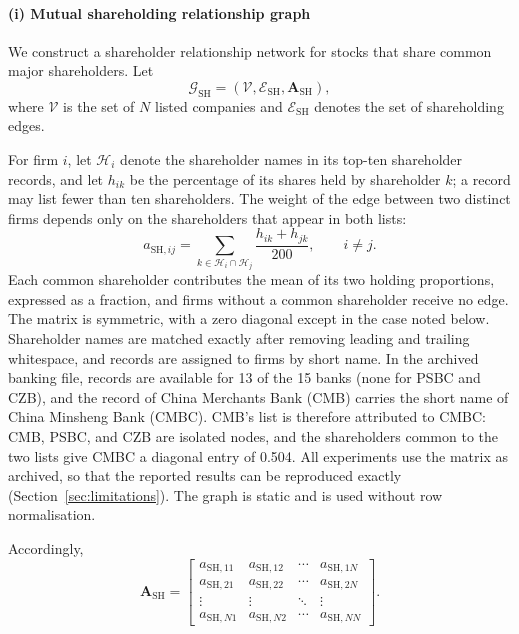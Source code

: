 \documentclass[pdflatex,sn-mathphys-num]{sn-jnl}%
\theoremstyle{thmstyleone}%
\theoremstyle{thmstyletwo}%
\theoremstyle{thmstylethree}%
\begin{document}
\paragraph{(i) Mutual shareholding relationship graph}
We construct a shareholder relationship network for stocks that share common major shareholders.
Let
\begin{equation}
\mathcal{G}_{\mathrm{SH}}=(\mathcal{V},\mathcal{E}_{\mathrm{SH}},\mathbf{A}_{\mathrm{SH}}),
\end{equation}
where $\mathcal{V}$ is the set of $N$ listed companies and $\mathcal{E}_{\mathrm{SH}}$ denotes the set of shareholding edges.
{\color{blue}
For firm $i$, let $\mathcal{H}_i$ denote the shareholder names in its top-ten shareholder records, and let $h_{ik}$ be the percentage of its shares held by shareholder $k$; a record may list fewer than ten shareholders. The weight of the edge between two distinct firms depends only on the shareholders that appear in both lists:
\begin{equation}
a_{\mathrm{SH},ij}
=
\sum_{k\in\mathcal{H}_i\cap\mathcal{H}_j}
\frac{h_{ik}+h_{jk}}{200},\qquad i\neq j.
\label{eq:ash_def}
\end{equation}
Each common shareholder contributes the mean of its two holding proportions, expressed as a fraction, and firms without a common shareholder receive no edge. The matrix is symmetric, with a zero diagonal except in the case noted below. Shareholder names are matched exactly after removing leading and trailing whitespace, and records are assigned to firms by short name. In the archived banking file, records are available for 13 of the 15 banks (none for PSBC and CZB), and the record of China Merchants Bank (CMB) carries the short name of China Minsheng Bank (CMBC). CMB's list is therefore attributed to CMBC: CMB, PSBC, and CZB are isolated nodes, and the shareholders common to the two lists give CMBC a diagonal entry of 0.504. All experiments use the matrix as archived, so that the reported results can be reproduced exactly (Section~\ref{sec:limitations}). The graph is static and is used without row normalisation.
\par}
Accordingly,
\begin{equation}
\mathbf{A}_{\mathrm{SH}}=
\begin{bmatrix}
a_{\mathrm{SH},11} & a_{\mathrm{SH},12} & \cdots & a_{\mathrm{SH},1N}\\
a_{\mathrm{SH},21} & a_{\mathrm{SH},22} & \cdots & a_{\mathrm{SH},2N}\\
\vdots & \vdots & \ddots & \vdots\\
a_{\mathrm{SH},N1} & a_{\mathrm{SH},N2} & \cdots & a_{\mathrm{SH},NN}
\end{bmatrix}.
\label{eq:ash_mat}
\end{equation}
\end{document}

